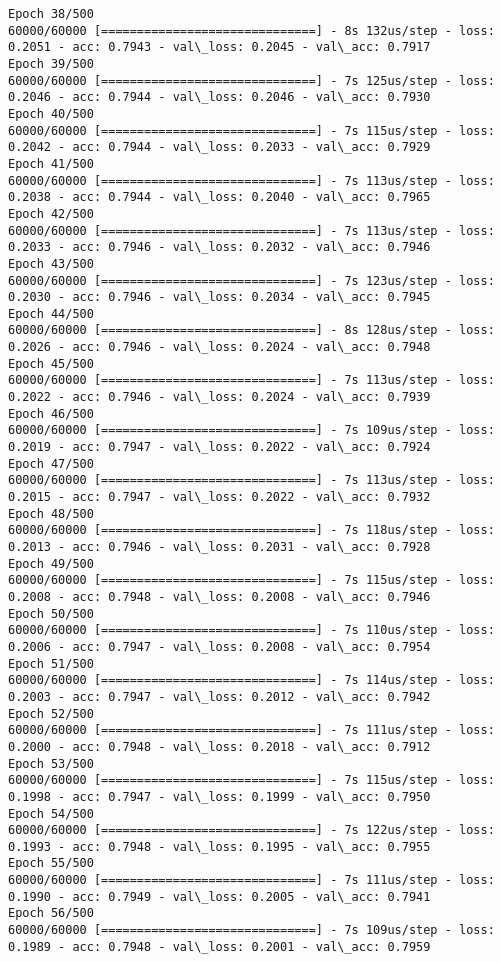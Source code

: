\documentclass[11pt]{article}
\begin{document}
\begin{Verbatim}[commandchars=\\\{\}]
Epoch 38/500
60000/60000 [==============================] - 8s 132us/step - loss: 0.2051 - acc: 0.7943 - val\_loss: 0.2045 - val\_acc: 0.7917
Epoch 39/500
60000/60000 [==============================] - 7s 125us/step - loss: 0.2046 - acc: 0.7944 - val\_loss: 0.2046 - val\_acc: 0.7930
Epoch 40/500
60000/60000 [==============================] - 7s 115us/step - loss: 0.2042 - acc: 0.7944 - val\_loss: 0.2033 - val\_acc: 0.7929
Epoch 41/500
60000/60000 [==============================] - 7s 113us/step - loss: 0.2038 - acc: 0.7944 - val\_loss: 0.2040 - val\_acc: 0.7965
Epoch 42/500
60000/60000 [==============================] - 7s 113us/step - loss: 0.2033 - acc: 0.7946 - val\_loss: 0.2032 - val\_acc: 0.7946
Epoch 43/500
60000/60000 [==============================] - 7s 123us/step - loss: 0.2030 - acc: 0.7946 - val\_loss: 0.2034 - val\_acc: 0.7945
Epoch 44/500
60000/60000 [==============================] - 8s 128us/step - loss: 0.2026 - acc: 0.7946 - val\_loss: 0.2024 - val\_acc: 0.7948
Epoch 45/500
60000/60000 [==============================] - 7s 113us/step - loss: 0.2022 - acc: 0.7946 - val\_loss: 0.2024 - val\_acc: 0.7939
Epoch 46/500
60000/60000 [==============================] - 7s 109us/step - loss: 0.2019 - acc: 0.7947 - val\_loss: 0.2022 - val\_acc: 0.7924
Epoch 47/500
60000/60000 [==============================] - 7s 113us/step - loss: 0.2015 - acc: 0.7947 - val\_loss: 0.2022 - val\_acc: 0.7932
Epoch 48/500
60000/60000 [==============================] - 7s 118us/step - loss: 0.2013 - acc: 0.7946 - val\_loss: 0.2031 - val\_acc: 0.7928
Epoch 49/500
60000/60000 [==============================] - 7s 115us/step - loss: 0.2008 - acc: 0.7948 - val\_loss: 0.2008 - val\_acc: 0.7946
Epoch 50/500
60000/60000 [==============================] - 7s 110us/step - loss: 0.2006 - acc: 0.7947 - val\_loss: 0.2008 - val\_acc: 0.7954
Epoch 51/500
60000/60000 [==============================] - 7s 114us/step - loss: 0.2003 - acc: 0.7947 - val\_loss: 0.2012 - val\_acc: 0.7942
Epoch 52/500
60000/60000 [==============================] - 7s 111us/step - loss: 0.2000 - acc: 0.7948 - val\_loss: 0.2018 - val\_acc: 0.7912
Epoch 53/500
60000/60000 [==============================] - 7s 115us/step - loss: 0.1998 - acc: 0.7947 - val\_loss: 0.1999 - val\_acc: 0.7950
Epoch 54/500
60000/60000 [==============================] - 7s 122us/step - loss: 0.1993 - acc: 0.7948 - val\_loss: 0.1995 - val\_acc: 0.7955
Epoch 55/500
60000/60000 [==============================] - 7s 111us/step - loss: 0.1990 - acc: 0.7949 - val\_loss: 0.2005 - val\_acc: 0.7941
Epoch 56/500
60000/60000 [==============================] - 7s 109us/step - loss: 0.1989 - acc: 0.7948 - val\_loss: 0.2001 - val\_acc: 0.7959

\end{Verbatim}
\end{document}
